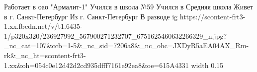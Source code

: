  
 
 
 
 

\par
Работает в оао "Армалит-1"
Учился в школа №59
Учился в Средняя школа
Живет в г. Санкт-Петербург
Из г. Санкт-Петербург
В разводе
\ifcmt
  ig https://scontent-frt3-1.xx.fbcdn.net/v/t1.6435-1/p320x320/236927992_567900271232707_6751625460632266329_n.jpg?_nc_cat=107&ccb=1-5&_nc_sid=7206a8&_nc_ohc=JXDyR5aEA04AX_Rm-rk&_nc_ht=scontent-frt3-1.xx&oh=054c0e12d42d2cd935dfff7161e92ea8&oe=615A4331
  width 0.15
\fi

